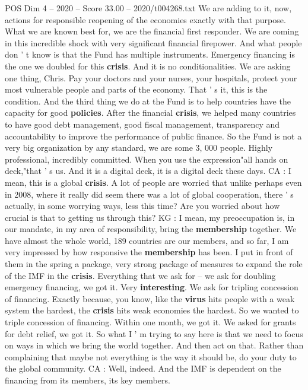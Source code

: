 \begin{textsample}{POS Dim 4 – 2020 – Score 33.00 – 2020/t004268.txt}
We are adding to it, now, actions for responsible reopening of the economies exactly with that purpose.
What we are known best for, we are the financial first responder.
We are coming in this incredible shock with very significant financial firepower.
And what people don ' t know is that the Fund has multiple instruments.
Emergency financing is the one we doubled for this \textbf{crisis}.
And it is no conditionalities.
We are asking one thing, Chris.
Pay your doctors and your nurses, your hospitals, protect your most vulnerable people and parts of the economy.
That ' s it, this is the condition.
And the third thing we do at the Fund is to help countries have the capacity for good \textbf{policies}.
After the financial \textbf{crisis}, we helped many countries to have good debt management, good fiscal management, transparency and accountability to improve the performance of public finance.
So the Fund is not a very big organization by any standard, we are some 3, 000 people.
Highly professional, incredibly committed.
When you use the expression"all hands on deck,"that ' s us.
And it is a digital deck, it is a digital deck these days.
CA : I mean, this is a global \textbf{crisis}.
A lot of people are worried that unlike perhaps even in 2008, where it really did seem there was a lot of global cooperation, there ' s actually, in some worrying ways, less this time?
Are you worried about how crucial is that to getting us through this?
KG : I mean, my preoccupation is, in our mandate, in my area of responsibility, bring the \textbf{membership} together.
We have almost the whole world, 189 countries are our members, and so far, I am very impressed by how responsive the \textbf{membership} has been.
I put in front of them in the spring a package, very strong package of measures to expand the role of the IMF in the \textbf{crisis}.
Everything that we ask for -- we ask for doubling emergency financing, we got it.
Very \textbf{interesting}.
We ask for tripling concession of financing.
Exactly because, you know, like the \textbf{virus} hits people with a weak system the hardest, the \textbf{crisis} hits weak economies the hardest.
So we wanted to triple concession of financing.
Within one month, we got it.
We asked for grants for debt relief, we got it.
So what I ' m trying to say here is that we need to focus on ways in which we bring the world together.
And then act on that.
Rather than complaining that maybe not everything is the way it should be, do your duty to the global community.
CA : Well, indeed.
And the IMF is dependent on the financing from its members, its key members.

\end{textsample}
